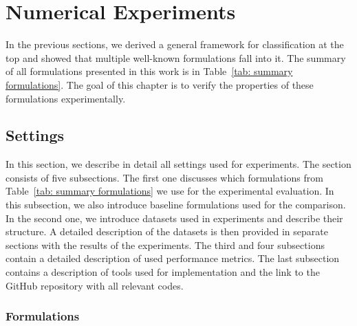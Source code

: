 \chapter{Numerical Experiments}\label{chap: experiments}

In the previous sections, we derived a general framework for classification at the top and showed that multiple well-known formulations fall into it. The summary of all formulations presented in this work is in Table~\ref{tab: summary formulations}. The goal of this chapter is to verify the properties of these formulations experimentally.

\section{Settings}\label{sec: settings}

In this section, we describe in detail all settings used for experiments. The section consists of five subsections. The first one discusses which formulations from Table~\ref{tab: summary formulations} we use for the experimental evaluation. In this subsection, we also introduce baseline formulations used for the comparison. In the second one, we introduce datasets used in experiments and describe their structure. A detailed description of the datasets is then provided in separate sections with the results of the experiments. The third and four subsections contain a detailed description of used performance metrics. The last subsection contains a description of tools used for implementation and the link to the GitHub repository with all relevant codes.

\subsection{Formulations}

